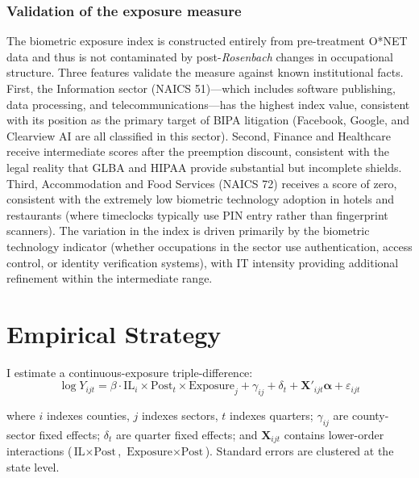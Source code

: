 \documentclass[12pt]{article}
\begin{document}
\subsubsection*{Validation of the exposure measure} The biometric exposure index is constructed entirely from pre-treatment O*NET data and thus is not contaminated by post-\textit{Rosenbach} changes in occupational structure. Three features validate the measure against known institutional facts. First, the Information sector (NAICS 51)---which includes software publishing, data processing, and telecommunications---has the highest index value, consistent with its position as the primary target of BIPA litigation (Facebook, Google, and Clearview AI are all classified in this sector). Second, Finance and Healthcare receive intermediate scores after the preemption discount, consistent with the legal reality that GLBA and HIPAA provide substantial but incomplete shields. Third, Accommodation and Food Services (NAICS 72) receives a score of zero, consistent with the extremely low biometric technology adoption in hotels and restaurants (where timeclocks typically use PIN entry rather than fingerprint scanners). The variation in the index is driven primarily by the biometric technology indicator (whether occupations in the sector use authentication, access control, or identity verification systems), with IT intensity providing additional refinement within the intermediate range.

\section{Empirical Strategy}
\label{sec:strategy}

I estimate a continuous-exposure triple-difference:
\begin{equation}
\log Y_{ijt} = \beta \cdot \text{IL}_i \times \text{Post}_t \times \text{Exposure}_j + \gamma_{ij} + \delta_t + \mathbf{X}'_{ijt}\boldsymbol{\alpha} + \varepsilon_{ijt}
\label{eq:main}
\end{equation}

\noindent where $i$ indexes counties, $j$ indexes sectors, $t$ indexes quarters; $\gamma_{ij}$ are county-sector fixed effects; $\delta_t$ are quarter fixed effects; and $\mathbf{X}_{ijt}$ contains lower-order interactions ($\text{IL} \times \text{Post}$, $\text{Exposure} \times \text{Post}$). Standard errors are clustered at the state level.
\end{document}
